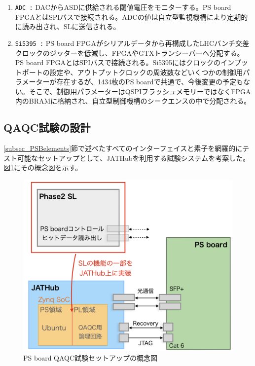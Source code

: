 \begin{enumerate}
    \item  \texttt{ADC :} DACからASDに供給される閾値電圧をモニターする。PS board FPGAとはSPIバスで接続される。ADCの値は自立型監視機構により定期的に読み出され、SLに送信される。
    \baselineskip

    \item \texttt{Si5395 :} PS board FPGAがシリアルデータから再構成したLHCバンチ交差クロックのジッターを低減し、FPGAやGTXトランシーバーへ分配する。PS board FPGAとはSPIバスで接続される。Si5395にはクロックのインプットポートの設定や、アウトプットクロックの周波数などいくつかの制御用パラメーターが存在するが、1434枚のPS boardで共通で、今後変更の予定もない。そこで、制御用パラメーターはQSPIフラッシュメモリーではなくFPGA内のBRAMに格納され、自立型制御機構のシークエンスの中で分配される。
    \baselineskip

\end{enumerate}

\subsection{QAQC試験の設計}
\label{subsec_QAQCdesign}
\ref{subsec_PSBelements}節で述べたすべてのインターフェイスと素子を網羅的にテスト可能なセットアップとして、JATHubを利用する試験システムを考案した。図\ref{PSBtestdesign}にその概念図を示す。

\begin{figure} 
\centering
\includegraphics[width=16cm]{fig/QAQC/PSBtestdesign.png}
\caption[PS board QAQC試験セットアップの概念図]{PS board QAQC試験セットアップの概念図}
\label{PSBtestdesign}
\end{figure}

